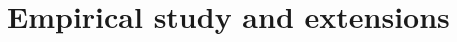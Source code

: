 \documentclass{beamer}
\begin{document}



\section{Empirical study and extensions}

\begin{frame}[plain]
  \addtocounter{framenumber}{-1}

  \begin{center}
    {\Large {}}
  \end{center}
\end{frame}
\end{document}
